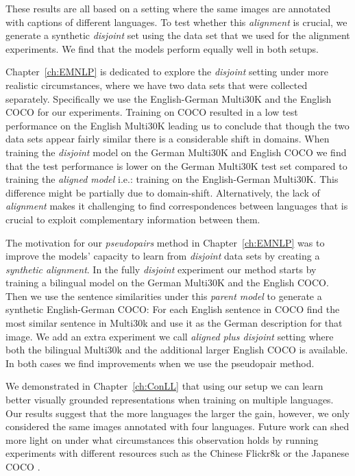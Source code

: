 These results are all based on a setting where the same images are annotated with captions 
 of different languages. To test whether this \emph{alignment} is crucial, we generate
 a synthetic \emph{disjoint} set using the data set that we used for the alignment experiments. We find
 that the models perform equally well in both setups.

Chapter~\ref{ch:EMNLP} is dedicated to explore the \emph{disjoint} setting under more realistic 
circumstances, where we have two data sets that were collected separately. 
Specifically we use the English-German Multi30K and the English COCO for our experiments.
Training on COCO resulted in a low test performance on the English Multi30K leading us to  conclude that 
though the two data sets appear fairly similar there is a considerable shift in domains. When training
the \emph{disjoint} model on the German Multi30K and English COCO we find that the test performance
is lower on the German Multi30K test set compared to training the \emph{aligned model} i.e.: training
on the English-German Multi30K. This difference might be partially due to domain-shift. Alternatively,
the lack of \emph{alignment} makes it challenging to find correspondences between languages that
is crucial to exploit complementary information between them.

The motivation for our \emph{pseudopairs} method in Chapter~\ref{ch:EMNLP} 
was to improve the models' capacity to learn from \emph{disjoint} data sets by 
creating a \emph{synthetic alignment}. In the fully \emph{disjoint} experiment our method
starts by training a bilingual model on the German Multi30K and the English COCO. Then we 
use the sentence similarities under this \emph{parent model} to generate a synthetic 
English-German COCO: For each English sentence in COCO find the most similar sentence in Multi30k
and use it as the German description for that image. We add an extra experiment we call \emph{aligned
plus disjoint} setting where both the bilingual Multi30k and the additional larger English COCO is available.
In both cases we find improvements when we use the pseudopair method.

We demonstrated in Chapter~\ref{ch:ConLL} that using our setup we can learn better 
visually grounded representations when training on multiple languages. Our results suggest that the
more languages the larger the gain, however, we only considered the same images annotated with 
four languages. Future work can shed more light on under what circumstances this observation holds
by running experiments with different resources such as the Chinese Flickr8k \citep{li2016adding}
or the Japanese COCO \citep{miyazaki2016cross}. 


